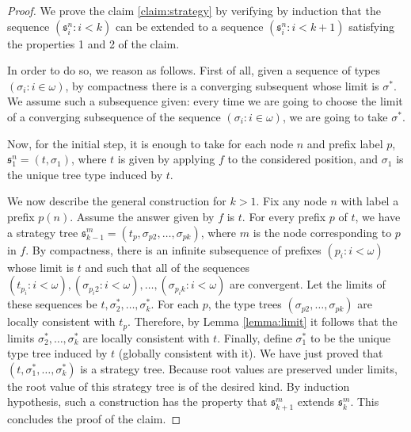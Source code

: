 \begin{proof}
We prove the claim \ref{claim:strategy} by verifying by induction that the sequence $(\mathfrak{s}^n_i: i < k)$ can be extended to a sequence $(\mathfrak{s}^n_i: i < k+1)$ satisfying the properties 1 and 2 of the claim. 



In order to do so, we reason as follows. First of all, given a sequence of types $(\sigma_i : i \in \omega)$, by compactness there is a converging subsequent whose limit is  $\sigma^*$. We assume such a subsequence given: every time we are going to choose the limit of a converging  subsequence of the sequence $(\sigma_i : i \in \omega)$, we are going to take $\sigma^*$.

Now, for the initial step, it is enough to take for each node $n$ and prefix label $p$, $\mathfrak{s}^n_1=(t, \sigma_1)$, where $t$ is given by applying $f$ to the considered position, and $\sigma_1$ is the unique tree type induced by $t$. 

We now describe the general construction for $k>1$. Fix any node $n$ with label a prefix $p(n)$. Assume the answer given by $f$ is $t$. For every prefix $p$ of $t$, we have a strategy tree $\mathfrak{s}^m_{k-1}=(t_p, \sigma_{p2}, \dots, \sigma_{pk})$, where $m$ is the node corresponding to $p$ in $f$. 
By compactness, there is an infinite subsequence of prefixes $(p_i: i < \omega)$ whose limit is $t$ and such that all of the sequences
$(t_{p_i}: i <\omega ), (\sigma_{p_i2}: i <\omega ), \dots,  (\sigma_{p_ik}: i <\omega )$ are convergent. Let the limits of these sequences be $t, \sigma^*_2, \dots, \sigma^*_k$.
For each $p$, the type trees $(\sigma_{p2}, \dots, \sigma_{pk})$
are locally consistent with $t_p$. Therefore, by Lemma \ref{lemma:limit} it follows that the limits $\sigma^*_2, \dots, \sigma^*_k$ are locally consistent with $t$. Finally, define $\sigma^*_1$ to be the unique type tree induced by  $t$ (globally consistent with it). We have just proved that
$(t, \sigma^*_1, \dots, \sigma^*_k)$
is a strategy tree. Because root values are preserved under limits, the root value
of this strategy tree is of the desired kind. By induction hypothesis, such a construction has the property that $\mathfrak{s}^m_{k+1}$ extends $\mathfrak{s}^m_{k}$. This concludes the proof of the claim.
  \end{proof}
